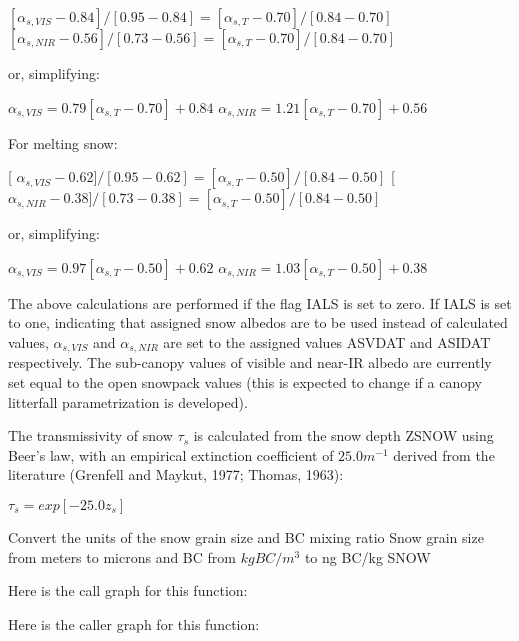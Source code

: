 $[\alpha_{s,VIS} - 0.84]/[0.95-0.84] = [\alpha_{s,T} - 0.70]/[0.84-0.70]$ $[\alpha_{s,NIR} - 0.56]/[0.73-0.56] = [\alpha_{s,T} - 0.70]/[0.84-0.70]$

or, simplifying\+:

$\alpha_{s,VIS} = 0.79[\alpha_{s,T} - 0.70] + 0.84$ $\alpha_{s,NIR} = 1.21[\alpha_{s,T} - 0.70] + 0.56$

For melting snow\+:

\mbox{[} $\alpha_{s,VIS} - 0.62]/[0.95-0.62] = [\alpha_{s,T} - 0.50]/[0.84-0.50]$ \mbox{[} $\alpha_{s,NIR} - 0.38]/[0.73-0.38] = [\alpha_{s,T} - 0.50]/[0.84-0.50]$

or, simplifying\+:

$\alpha_{s,VIS} = 0.97[\alpha_{s,T} - 0.50] + 0.62$ $\alpha_{s,NIR} = 1.03[\alpha_{s,T} - 0.50] + 0.38$

The above calculations are performed if the flag I\+A\+L\+S is set to zero. If I\+A\+L\+S is set to one, indicating that assigned snow albedos are to be used instead of calculated values, $\alpha_{s,VIS}$ and $\alpha_{s,NIR}$ are set to the assigned values A\+S\+V\+D\+A\+T and A\+S\+I\+D\+A\+T respectively. The sub-\/canopy values of visible and near-\/\+I\+R albedo are currently set equal to the open snowpack values (this is expected to change if a canopy litterfall parametrization is developed).

The transmissivity of snow $\tau_s$ is calculated from the snow depth Z\+S\+N\+O\+W using Beer’s law, with an empirical extinction coefficient of $25.0 m^{-1}$ derived from the literature (Grenfell and Maykut, 1977; Thomas, 1963)\+:

$\tau_s = exp[-25.0 z_s]$

Convert the units of the snow grain size and B\+C mixing ratio Snow grain size from meters to microns and B\+C from $kg BC/m^3$ to ng B\+C/kg S\+N\+O\+W

Here is the call graph for this function\+:




Here is the caller graph for this function\+:


